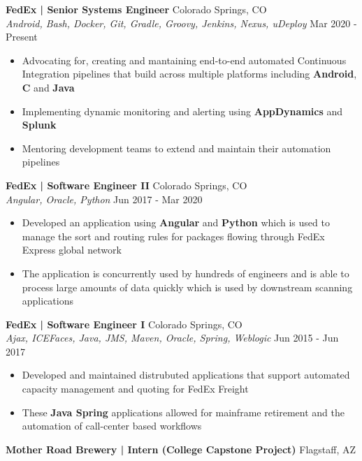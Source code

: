 \documentclass[a4paper]{article}
\begin{document}
\textbf{FedEx | Senior Systems Engineer} \hfill Colorado Springs, CO\\
\textsl{Android, Bash, Docker, Git, Gradle, Groovy, Jenkins, Nexus, uDeploy} \hfill Mar 2020 - Present\\
\vspace{-1mm}
\begin{itemize} \itemsep 1pt
	\item 	Advocating for, creating and mantaining end-to-end automated Continuous Integration pipelines that build across multiple platforms including \textbf{Android}, \textbf{C} and \textbf{Java}
	\item  Implementing dynamic monitoring and alerting using \textbf{AppDynamics} and \textbf{Splunk} 
	\item  Mentoring development teams to extend and maintain their automation pipelines
\end{itemize}
\textbf{FedEx | Software Engineer II} \hfill Colorado Springs, CO\\
\textsl{Angular, Oracle, Python} \hfill Jun 2017 - Mar 2020\\
\vspace{-1mm}
\begin{itemize} \itemsep 1pt
	\item  Developed an application using \textbf{Angular} and \textbf{Python} which is used to manage the sort and routing rules for packages flowing through FedEx Express global network 
	\item  The application is concurrently used by hundreds of engineers and is able to process large amounts of data quickly which is used by downstream scanning applications
\end{itemize}
\textbf{FedEx | Software Engineer I} \hfill Colorado Springs, CO\\
\textsl{Ajax, ICEFaces, Java, JMS, Maven, Oracle, Spring, Weblogic} \hfill Jun 2015 - Jun 2017\\
\vspace{-1mm}
\begin{itemize} \itemsep 1pt
	\item  Developed and maintained distrubuted applications that support automated capacity management and quoting for FedEx Freight 
	\item These \textbf{Java Spring} applications allowed for mainframe retirement and the automation of call-center based workflows
\end{itemize}
\textbf{Mother Road Brewery | Intern (College Capstone Project)} \hfill Flagstaff, AZ\\
\end{document}
